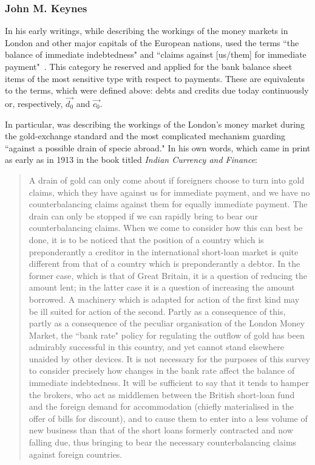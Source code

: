 \subsubsection{John M. Keynes}

In his early writings, while describing the workings of the money markets in London and other major capitals of the European nations, \citeauthor{keynes1971_1} used the terms ``the balance of immediate indebtedness" and ``claims against [us/them] for immediate payment"~\citep[pp.~13,16]{keynes1971_1}. This category he reserved and applied for the bank balance sheet items of the most sensitive type with respect to payments. These are equivalents to the terms, which were defined above: debts and credits due today continuously or, respectively, $\overrightarrow{d_0}$ and $\overrightarrow{c_0}$.

In particular, \citeauthor{keynes1971_1} was describing the workings of the London's money market during the gold-exchange standard and the most complicated mechanism guarding ``against a possible drain of specie abroad." In his own words, which came in print as early as in 1913 in the book titled \textit{Indian Currency and Finance}:

\begin{quote}
A drain of gold can only come about if foreigners choose to turn into gold claims, which they have against us for immediate payment, and we have no counterbalancing claims against them for equally immediate payment. The drain can only be stopped if we can rapidly bring to bear our counterbalancing claims. When we come to consider how this can best be done, it is to be noticed that the position of a country which is preponderantly a creditor in the international short-loan market is quite different from that of a country which is preponderantly a debtor. In the former case, which is that of Great Britain, it is a question of reducing the amount lent; in the latter case it is a question of increasing the amount borrowed. A machinery which is adapted for action of the first kind may be ill suited for action of the second. Partly as a consequence of this, partly as a consequence of the peculiar organisation of the London Money Market, the ``bank rate" policy for regulating the outflow of gold has been admirably successful in this country, and yet cannot stand elsewhere unaided by other devices. It is not necessary for the purposes of this survey to consider precisely how changes in the bank rate affect the balance of immediate indebtedness. It will be sufficient to say that it tends to hamper the brokers, who act as middlemen between the British short-loan fund and the foreign demand for accommodation (chiefly materialised in the offer of bills for discount), and to cause them to enter into a less volume of new business than that of the short loans formerly contracted and now falling due, thus bringing to bear the necessary counterbalancing claims against foreign countries.~\citep[pp.~12-13]{keynes1971_1}
\end{quote}

